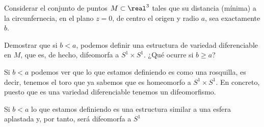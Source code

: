 \begin{problem}[14]
Considerar el conjunto de puntos $M \subset \real^3$ tales que su distancia (mínima) a la circunfernecia, en el plano $z=0$, de centro el origen y radio $a$, sea exactamente $b$.

Demostrar que si $b< a$, podemos definir una estructura de variedad diferenciable en $M$, que es, de hecho, difeomorfa a $S^1 \times S^1$. ¿Qué ocurre si $b \geq a$?

\solution


Si $b<a$ podemos ver que lo que estamos definiendo es como una rosquilla, es decir, tenemos el toro que ya sabemos que es homeomorfo a $S^1 \times S^1$. En concreto, puesto que es una variedad diferenciable tenemos un difeomorfismo.

Si $b<a$ lo que estamos definiendo es una estructura similar a una esfera aplastada y, por tanto, será difeomorfa a $S^1$

\end{problem}


